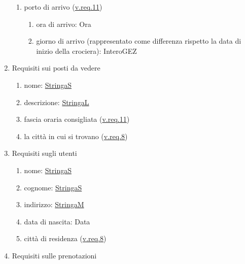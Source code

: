 \documentclass{article}
\begin{document}
\begin{enumerate}
\begin{enumerate}
        \item porto di arrivo (\hyperref[sec:RequisitiPorto]{v.req.11})\label{sec:RequisitiItinerarioPortoDiArrivo}
        \begin{enumerate}
            \item ora di arrivo: Ora\label{sec:RequisitiItinerarioPortoDiArrivoOra}
            \item giorno di arrivo (rappresentato come differenza rispetto la data di inizio della crociera): InteroGEZ\label{sec:RequisitiItinerarioPortoDiArrivoGiorno}
        \end{enumerate}
    \end{enumerate}
    \item Requisiti sui posti da vedere\label{sec:RequisitiPostoDaVedere}
    \begin{enumerate}
        \item nome: \hyperref[sec:StringaS]{StringaS}\label{sec:RequisitiPostoDaVedereNome}
        \item descrizione: \hyperref[sec:StringaL]{StringaL}\label{sec:RequisitiPostoDaVedereDescrizione}
        \item fascia oraria consigliata (\hyperref[sec:RequisitiOrarioPostoDaVedere]{v.req.11})\label{sec:RequisitiPostoDaVedereFasciaOrariaConsigliata}
        \item la città in cui si trovano (\hyperref[sec:RequisitiCittà]{v.req.8})\label{sec:RequisitiPostoDaVedereCittà}
    \end{enumerate}
    \item Requisiti sugli utenti\label{sec:RequisitiUtente}
    \begin{enumerate}
        \item nome: \hyperref[sec:StringaS]{StringaS}\label{sec:RequisitiUtenteNome}
        \item cognome: \hyperref[sec:StringaS]{StringaS}\label{sec:RequisitiUtenteCognome}
        \item indirizzo: \hyperref[sec:StringaM]{StringaM}\label{sec:RequisitiUtenteIndirizzo}
        \item data di nascita: Data\label{sec:RequisitiUtenteDataDiNascita}
        \item città di residenza (\hyperref[sec:RequisitiCittà]{v.req.8})\label{sec:RequisitiUtenteCittàDiResidenza}
    \end{enumerate}
    \item Requisiti sulle prenotazioni\label{sec:RequisitiPrenotazione}
    \begin{enumerate}

\end{enumerate}
\end{enumerate}
\end{document}
